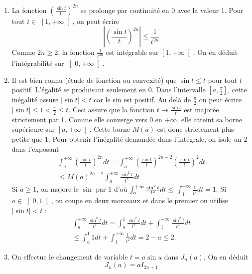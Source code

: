 \begin{enumerate}
\item  La fonction $\left( \frac{\sin t}{t}\right) ^{2n}$ se prolonge par
continuit\'{e} en 0 avec la valeur 1. Pour tout $t\in $ $\left[ 1,+\infty
\right[ $, on peut \'{e}crire 
\[
\left| \left( \frac{\sin t}{t}\right) ^{2n}\right| \leq \frac{1}{t^{2n}}
\]
Comme $2n\geq 2$, la fonction $\frac{1}{t^{2n}}$ est int\'{e}grable sur $%
\left[ 1,+\infty \right[ $. On en d\'{e}duit l'int\'{e}grabilit\'{e} sur $%
\left] 0,+\infty \right[ $.

\item  Il est bien connu (\'{e}tude de fonction ou convexit\'{e}) que $\sin
t\leq t$ pour tout $t$ positif. L'\'{e}galit\'{e} se produisant seulement en
0. Dans l'intervalle $\left[ a,\frac{\pi }{2}\right] $, cette
in\'{e}galit\'{e} assure $\left| \sin t\right| <t$ car le sin est positif.
Au del\`{a} de $\frac{\pi }{2}$ on peut \'{e}crire $\left| \sin t\right|
\leq 1<\frac{\pi }{2}\leq t$. Ceci assure que la fonction $t\rightarrow 
\frac{\sin t}{t}$ est major\'{e}e strictement par 1. Comme elle converge
vers 0 en +$\infty $, elle atteint sa borne sup\'{e}rieure sur $\left[
a,+\infty \right[ $. Cette borne $M(a)$ est donc strictement plus petite que
1.\newline
Pour obtenir l'in\'{e}galit\'{e} demand\'{e}e dans l'int\'{e}grale, on isole
un 2 dans l'exposant 
\begin{multline*}
\int_{a}^{+\infty }\left( \frac{\sin t}{t}\right) ^{2n}dt = \int_{a}^{+\infty}\left( \frac{\sin t}{t}\right)^{2n-2}\left( \frac{\sin t}{t}\right)
^{2}dt \\
\leq M(a)^{2n-2}\int_{a}^{+\infty }\frac{\sin ^{2}t}{t^{2}}dt
\end{multline*}
Si $a\geq 1$, on majore le $\sin $ par 1 d'o\`{u} $\int_{a}^{+\infty }\frac{%
\sin ^{2}t}{t^{2}}dt\leq $ $\int_{1}^{+\infty }\frac{1}{t^{2}}dt=1$.\newline
Si $a\in \left] 0,1\right[ $, on coupe en deux morceaux et dans le premier
on utilise $\left| \sin t\right| <t$ : 
\begin{multline*}
\int_{a}^{+\infty }\frac{\sin ^{2}t}{t^{2}}dt =
\int_{a}^{1}\frac{\sin ^{2}t}{t^{2}}dt+\int_{1}^{+\infty }\frac{\sin ^{2}t}{t^{2}}dt \\
\leq \int_{a}^{1}1dt+\int_{1}^{+\infty }\frac{1}{t^{2}}dt = 2-a \leq 2.
\end{multline*}

\item  On effectue le changement de variable $t=a\sin u$ dans $J_{n}(a)$. On
en d\'{e}duit 
\[
J_{n}(a)=aI_{2n+1} 
\]


\end{enumerate}
